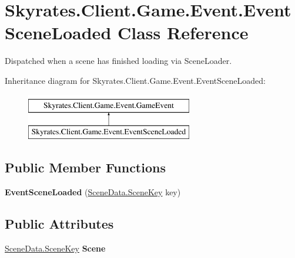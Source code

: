 \hypertarget{class_skyrates_1_1_client_1_1_game_1_1_event_1_1_event_scene_loaded}{\section{Skyrates.\-Client.\-Game.\-Event.\-Event\-Scene\-Loaded Class Reference}
\label{class_skyrates_1_1_client_1_1_game_1_1_event_1_1_event_scene_loaded}
}


Dispatched when a scene has finished loading via Scene\-Loader.  


Inheritance diagram for Skyrates.\-Client.\-Game.\-Event.\-Event\-Scene\-Loaded\-:\begin{figure}[H]
\begin{center}
\leavevmode
\includegraphics[height=2.000000cm]{class_skyrates_1_1_client_1_1_game_1_1_event_1_1_event_scene_loaded}
\end{center}
\end{figure}
\subsection*{Public Member Functions}
\begin{DoxyCompactItemize}
\item 
\hypertarget{class_skyrates_1_1_client_1_1_game_1_1_event_1_1_event_scene_loaded_a626a0f186114b9ebd5684238e1157319}{{\bfseries Event\-Scene\-Loaded} (\hyperlink{class_skyrates_1_1_client_1_1_scene_1_1_scene_data_a31ee71a248fd3456a7e655f71f268583}{Scene\-Data.\-Scene\-Key} key)}\label{class_skyrates_1_1_client_1_1_game_1_1_event_1_1_event_scene_loaded_a626a0f186114b9ebd5684238e1157319}

\end{DoxyCompactItemize}
\subsection*{Public Attributes}
\begin{DoxyCompactItemize}
\item 
\hypertarget{class_skyrates_1_1_client_1_1_game_1_1_event_1_1_event_scene_loaded_af842f8c33a313b1eee1e07ab89816d61}{\hyperlink{class_skyrates_1_1_client_1_1_scene_1_1_scene_data_a31ee71a248fd3456a7e655f71f268583}{Scene\-Data.\-Scene\-Key} {\bfseries Scene}}\label{class_skyrates_1_1_client_1_1_game_1_1_event_1_1_event_scene_loaded_af842f8c33a313b1eee1e07ab89816d61}

\end{DoxyCompactItemize}


